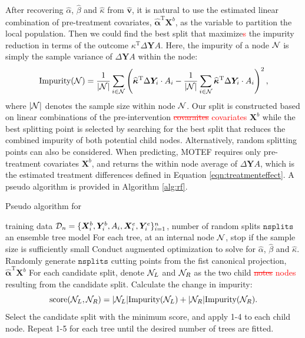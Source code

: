 \documentclass[smallextended]{svjour3}
\newcommand{\trnp}{^\text{T}}
\newcommand{\bg}[1]{\textcolor{red}{#1}}
\begin{document}
After recovering $\widehat \alpha$, $\widehat \beta$ and $\widehat \kappa$ from $\widehat{\bm{v}}$, it is natural to use the estimated linear combination of pre-treatment covariates, $\bm{\hat{\alpha}}\trnp \bm X^b$, as the variable to partition the local population. Then we could find the best split that maximize\bg{s} the impurity reduction in terms of the outcome $\kappa\trnp \Delta \bm{Y}A$. Here, the impurity of a node $\cal N$ is simply the sample variance of $\Delta \bm{Y} A$ within the node:
\[
    \text{Impurity}({\cal N})  = \frac{1}{|\cal N|}\sum_{i \in {\cal N}} \left(\bm{\widehat{\kappa}}\trnp \Delta \bm{Y}_i \cdot A_i - \frac{1}{|\cal N|}\sum_{i \in \cal N} \bm{\widehat{\kappa}}\trnp \Delta \bm{Y}_i \cdot A_i\right)^2,
\]
where $|{\cal N}|$ denotes the sample size within node ${\cal N}$. Our split is constructed based on linear combinations of the pre-intervention \bg{\st{covaraites} covariates} $\bm{X}^b$ while the best splitting point is selected by searching for the best split that reduces the combined impurity of both potential child nodes. Alternatively, random splitting points \citep{geurts2006extremely} can also be considered. When predicting, MOTEF requires only pre-treatment covariates $\bm{X}^b$, and returns the within node average of $\Delta \bm{Y} A$, which is the estimated treatment differences defined in Equation \eqref{eqn:treatmenteffect}. A pseudo algorithm is provided in Algorithm \ref{alg:rf}.

\begin{algorithm}
    \caption{Pseudo algorithm for }
    \begin{algorithmic}[1]
        \INPUT training data ${\cal D}_n = \{\bm X^b_i, \bm Y^b_i, A_i, \bm X^e_i, \bm Y^e_i\}_{i=1}^n$, number of random splits $\texttt{nsplits}$
        \OUTPUT an ensemble tree model
        \STATE For each tree, at an internal node ${\cal N}$, stop if the sample size is sufficiently small
        \STATE Conduct augmented optimization to solve for $\widehat \alpha$, $\widehat \beta$ and $\widehat \kappa$.
        \STATE Randomly generate $\texttt{nsplits}$ cutting points from the fist canonical projection, $\bm{\hat{\alpha}}\trnp \bm X^b$ 
        \STATE For each candidate split, denote ${\cal N}_L$ and ${\cal N}_R$ as the two child \bg{\st{notes} nodes} resulting from the candidate split. Calculate the change in impurity:
        \[
        \text{score}( {\cal N}_L, {\cal N}_R) = |{\cal N}_L| \text{Impurity}({\cal N}_L) + |{\cal N}_R|\text{Impurity}({\cal N}_R).
        \]
        \STATE Select the candidate split with the minimum score, and apply 1-4 to each child node.
        \STATE Repeat 1-5 for each tree until the desired number of trees are fitted.
    \end{algorithmic} \label{alg:rf}
\end{algorithm}
\end{document}
